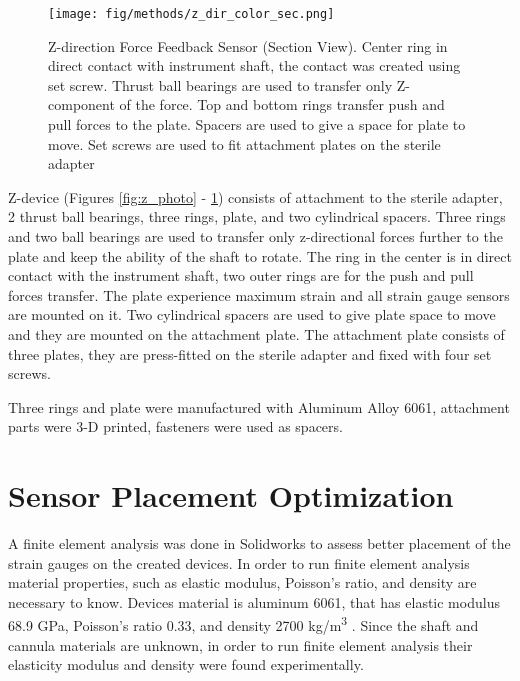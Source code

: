 \begin{figure}[h]
	\begin{center}
		\texttt{[image: fig/methods/z\_dir\_color\_sec.png]}
	\end{center}
	\vspace{-4mm}
	\caption[Z-direction Force Feedback Sensor (Section View)]
	{Z-direction Force Feedback Sensor (Section View). Center ring in direct contact with instrument shaft, the contact was created using set screw. Thrust ball bearings are used to transfer only Z-component of the force. Top and bottom rings transfer push and pull forces to the plate. Spacers are used to give a space for plate to move. Set screws are used to fit attachment plates on the sterile adapter}
	\label{fig:Z-direction_sec}
	\vspace{-2mm}
\end{figure}


Z-device (Figures \ref{fig:z_photo} - \ref{fig:Z-direction_sec}) consists of attachment to the sterile adapter, 2 thrust ball bearings, three rings, plate, and two cylindrical spacers. Three rings and two ball bearings are used to transfer only z-directional forces further to the plate and keep the ability of the shaft to rotate. The ring in the center is in direct contact with the instrument shaft, two outer rings are for the push and pull forces transfer. The plate experience maximum strain and all strain gauge sensors are mounted on it.  Two cylindrical spacers are used to give plate space to move and they are mounted on the attachment plate. The attachment plate consists of three plates, they are press-fitted on the sterile adapter and fixed with four set screws.

Three rings and plate were manufactured with Aluminum Alloy 6061, attachment parts were 3-D printed, fasteners were used as spacers.

\section{Sensor Placement Optimization}
\label{sec:SimMod}
A finite element analysis was done in Solidworks to assess better placement of the strain gauges on the created devices. In order to run finite element analysis material properties, such as elastic modulus, Poisson's ratio, and density are necessary to know. Devices material is aluminum 6061, that has elastic modulus 68.9 GPa, Poisson's ratio 0.33, and density 2700 kg/m\textsuperscript{3} \cite{aluminum_properties}. Since the shaft and cannula materials are unknown, in order to run finite element analysis their elasticity modulus and density were found experimentally.
	
